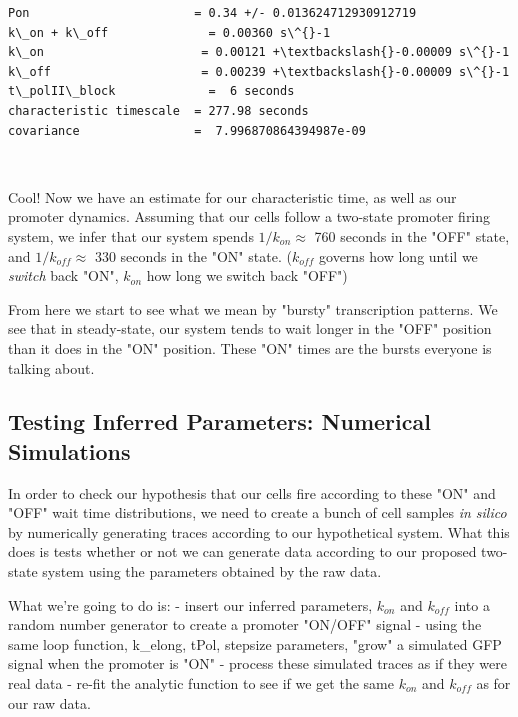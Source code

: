 \documentclass[11pt]{article}
\begin{document}
    \begin{Verbatim}[commandchars=\\\{\}]
Pon                       = 0.34 +/- 0.013624712930912719
k\_on + k\_off              = 0.00360 s\^{}-1
k\_on                      = 0.00121 +\textbackslash{}-0.00009 s\^{}-1
k\_off                     = 0.00239 +\textbackslash{}-0.00009 s\^{}-1
t\_polII\_block             =  6 seconds
characteristic timescale  = 277.98 seconds
covariance                =  7.996870864394987e-09

    \end{Verbatim}

    \begin{center}
    \end{center}
    { \hspace*{\fill} \\}
    
    Cool! Now we have an estimate for our characteristic time, as well as
our promoter dynamics. Assuming that our cells follow a two-state
promoter firing system, we infer that our system spends
\(1/k_{on}\approx\) 760 seconds in the "OFF" state, and
\(1/k_{off}\approx\) 330 seconds in the "ON" state. (\(k_{off}\) governs
how long until we \emph{switch} back "ON", \(k_{on}\) how long we switch
back "OFF")

    From here we start to see what we mean by "bursty" transcription
patterns. We see that in steady-state, our system tends to wait longer
in the "OFF" position than it does in the "ON" position. These "ON"
times are the bursts everyone is talking about.

    \subsection{Testing Inferred Parameters: Numerical
Simulations}\label{testing-inferred-parameters-numerical-simulations}

In order to check our hypothesis that our cells fire according to these
"ON" and "OFF" wait time distributions, we need to create a bunch of
cell samples \emph{in silico} by numerically generating traces according
to our hypothetical system. What this does is tests whether or not we
can generate data according to our proposed two-state system using the
parameters obtained by the raw data.

What we're going to do is: - insert our inferred parameters, \(k_{on}\)
and \(k_{off}\) into a random number generator to create a promoter
"ON/OFF" signal - using the same loop function, k\_elong, tPol, stepsize
parameters, "grow" a simulated GFP signal when the promoter is "ON" -
process these simulated traces as if they were real data - re-fit the
analytic function to see if we get the same \(k_{on}\) and \(k_{off}\)
as for our raw data.
\end{document}
